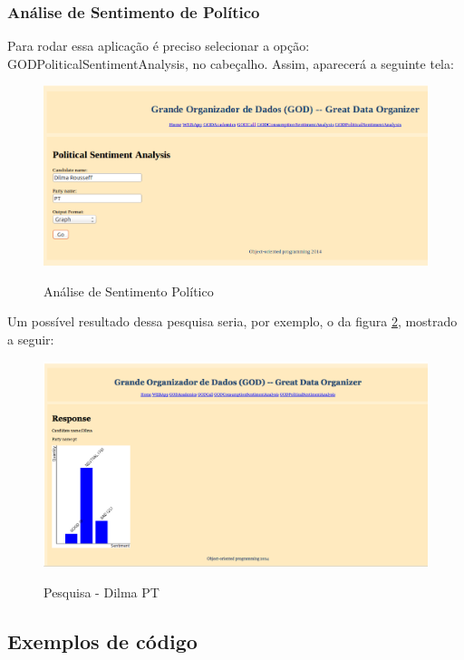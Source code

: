 \subsubsection{Análise de Sentimento de Político}
Para rodar essa aplicação é preciso selecionar a opção: GODPoliticalSentimentAnalysis, no cabeçalho. Assim, aparecerá a seguinte tela:

\begin{figure}[h!]
\caption{Análise de Sentimento Político}
\centering
\includegraphics[width=14cm]{figures/politico-pesquisa.png}
\label{fig:pol-pesq}
\end{figure}

Um possível resultado dessa pesquisa seria, por exemplo, o da figura \ref{fig:pol-result}, mostrado a seguir:

\begin{figure}[h!]
\caption{Pesquisa - Dilma PT}
\centering
\includegraphics[width=14cm]{figures/politico-resultado.png}
\label{fig:pol-result}
\end{figure}

\subsection{Exemplos de código}

